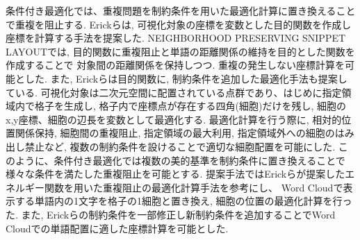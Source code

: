 \documentclass[syuuron]{kuee}
\begin{document}
		条件付き最適化では、重複問題を制約条件を用いた最適化計算に置き換えることで重複を阻止する. 
		Erickらは, 可視化対象の座標を変数とした目的関数を作成し座標を計算する手法を提案した\cite{or1}. 
		NEIGHBORHOOD PRESERVING SNIPPET LAYOUTでは, 目的関数に重複阻止と単語の距離関係の維持を目的とした関数を作成することで
		対象間の距離関係を保持しつつ. 重複の発生しない座標計算を可能とした. 
		また, Erickらは目的関数に, 制約条件を追加した最適化手法も提案している\cite{or2}.  
		可視化対象は二次元空間に配置されている点群であり、はじめに指定領域内で格子を生成し, 格子内で座標点が存在する四角(細胞)だけを残し, 
		細胞のx,y座標、細胞の辺長を変数として最適化する. 
		最適化計算を行う際に, 相対的位置関係保持, 細胞間の重複阻止, 指定領域の最大利用, 指定領域外への細胞のはみ出し禁止など, 
		複数の制約条件を設けることで適切な細胞配置を可能にした. 
		このように、条件付き最適化では複数の美的基準を制約条件に置き換えることで様々な条件を満たした重複阻止を可能とする. 
		提案手法ではErickらが提案したエネルギー関数を用いた重複阻止の最適化計算手法を参考にし、
		Word Cloudで表示する単語内の1文字を格子の1細胞と置き換え, 細胞の位置の最適化計算を行った. 
		また, Erickらの制約条件を一部修正し新制約条件を追加することでWord Cloudでの単語配置に適した座標計算を可能とした. 
	
\end{document}
